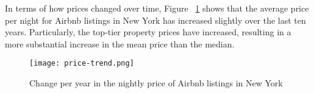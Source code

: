 
In terms of how prices changed over time, Figure
~\ref{fig:prices-change-by-years} shows that the average price per night for
Airbnb listings in New York has increased slightly over the
last ten years. Particularly, the top-tier property prices have increased,
resulting in a more substantial increase in the mean price than the median.


\begin{figure}[H] \centering
    \texttt{[image: price-trend.png]}
    \caption{Change per year in the nightly price of Airbnb listings in New York}
    \label{fig:prices-change-by-years}
\end{figure}

